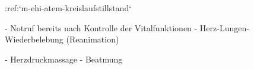 %
:ref:`m-ehi-atem-kreislaufstillstand`
\begin{itemize}
  -   Notruf bereits nach Kontrolle der Vitalfunktionen
  -   Herz-Lungen-Wiederbelebung (Reanimation)
  \begin{itemize}
    -   Herzdruckmassage
    -   Beatmung
  \end{itemize}
\end{itemize}

